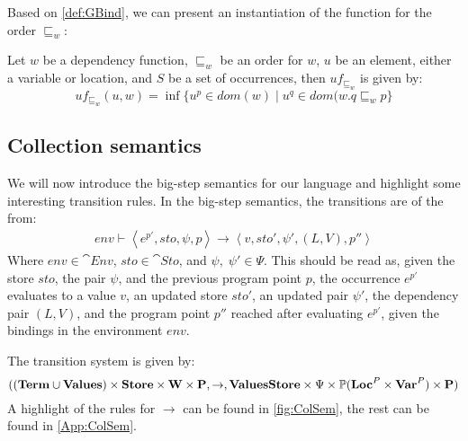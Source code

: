 \documentclass[../../master.tex]{subfiles}
\begin{document}
Based on \cref{def:GBind}, we can present an instantiation of the function for the order $\sqsubseteq_w$:

\begin{definition}[]
	Let $w$ be a dependency function, $\sqsubseteq_w$ be an order for $w$, $u$ be an element, either a variable or location, and $S$ be a set of occurrences, then $uf_{\sqsubseteq_w}$ is given by:
	$$uf_{\sqsubseteq_w}(u,w)=\inf\{u^p\in dom(w)\mid u^q\in dom(w.q\sqsubseteq_w p\}$$
\end{definition}


\iffalse
In the semantics, which we present in \cref{sec:sem}, we need to lookup the dependencies of variables and locations.
This lookup is always for the greatest lower-bound of a variable or location, i.e., the newest bound variable, which is defined as:

\begin{definition}[$inf$ function]
	Let $\psi\in\Psi$ be a partial order, where $\psi=(w,\sqsubseteq_w)$, then the greatest lower-bound function for an element, $u\in\cat{Loc}\cup\cat{Var}$, is as follows:
	$$inf_\psi(u)=p$$
	iff
	$$p=\inf\{p'\in dom(w)\mid x^{q'}\in dom(w). q'\sqsubseteq_w p'\}$$
\end{definition}
\fi

\subsection{Collection semantics}\label{sec:sem}
We will now introduce the big-step semantics for our language and highlight some interesting transition rules.
In the big-step semantics, the transitions are of the from:
\begin{align*}
env\vdash\left\langle e^{p'},sto,\psi,p\right\rangle\rightarrow\left\langle v,sto',\psi',(L,V),p''\right\rangle
\end{align*}
Where $env\in\cat{Env}$, $sto\in\cat{Sto}$, and $\psi,\;\psi'\in\Psi$.
This should be read as, given the store $sto$, the pair $\psi$, and the previous program point $p$, the occurrence $e^{p'}$ evaluates to a value $v$, an updated store $sto'$, an updated pair $\psi'$, the dependency pair $(L,V)$, and the program point $p''$ reached after evaluating $e^{p'}$, given the bindings in the environment $env$.

The transition system is given by:
$$((\textbf{Term}\cup\textbf{Values})\times\textbf{Store}\times\textbf{W}\times\textbf{P},\rightarrow,\textbf{Values}\textbf{Store}\times\Psi\times\mathbb{P}(\textbf{Loc}^P\times\textbf{Var}^P)\times\textbf{P})$$
A highlight of the rules for $\rightarrow$ can be found in \cref{fig:ColSem}, the rest can be found in \cref{App:ColSem}.
\end{document}
